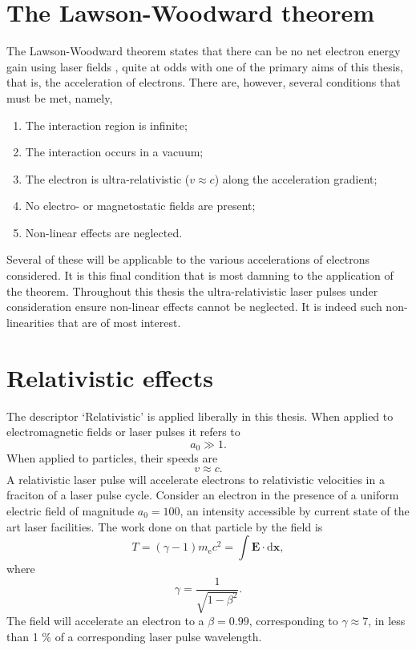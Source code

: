 \section{The Lawson-Woodward theorem}\label{sec:intro-lawson_woodward}
The Lawson-Woodward theorem states that there can be no net electron energy gain using laser fields \cite{esareyPhysicsLaserdrivenPlasmabased2009}, quite at odds with one of the primary aims of this thesis, that is, the acceleration of electrons. There are, however, several conditions that must be met, namely,
\begin{enumerate}
	\item The interaction region is infinite;
	\item The interaction  occurs in a vacuum;
	\item The electron is ultra-relativistic ($v\approx c$) along the acceleration gradient;
	\item No electro- or magnetostatic fields are present;
	\item Non-linear effects are neglected.
\end{enumerate}
Several of these will be applicable to the various accelerations of electrons considered. It is this final condition that is most damning to the application of the theorem. Throughout this thesis the ultra-relativistic laser pulses under consideration ensure non-linear effects cannot be neglected. It is indeed such non-linearities that are of most interest.

\section{Relativistic effects}
The descriptor `Relativistic' is applied liberally in this thesis. When applied to electromagnetic fields or laser pulses it refers to 
\begin{equation}
	a_0 \gg 1.
\end{equation}
When applied to particles, their speeds are
\begin{equation}
	v \approx c.
\end{equation}
A relativistic laser pulse will accelerate electrons to relativistic velocities in a fraciton of a laser pulse cycle. Consider an electron in the presence of a uniform electric field of magnitude $a_0 = 100$, an intensity accessible by current state of the art laser facilities. The work done on that particle by the field is 
\begin{equation}
	T = (\gamma -1)m_\mathrm{e}c^2 = \int \mathbf{E}\cdot \mathrm{d} \mathbf{x},
\end{equation}
where 
\begin{equation}
	\gamma = \frac{1}{\sqrt{1-\beta^2}}.
\end{equation}
The field will accelerate an electron to a $\beta = 0.99$, corresponding to $\gamma \approx 7$, in less than 1 \% of a corresponding laser pulse wavelength.

